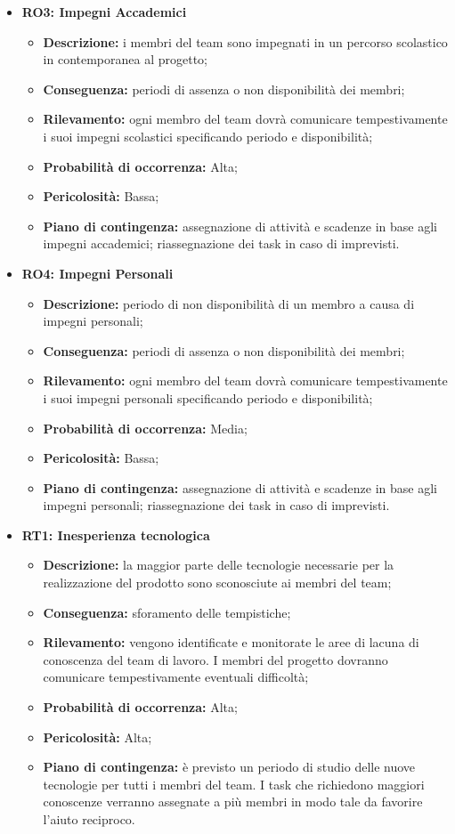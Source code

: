 \begin{itemize}
	\item \textbf{RO3: Impegni Accademici}
	\begin{itemize}
		\item \textbf{Descrizione:} i membri del team sono impegnati in un percorso scolastico in contemporanea al progetto;
		\item \textbf{Conseguenza:} periodi di assenza o non disponibilità dei membri;
		\item \textbf{Rilevamento:} ogni membro del team dovrà comunicare tempestivamente i suoi impegni scolastici specificando periodo e disponibilità;
		\item \textbf{Probabilità di occorrenza:} Alta;
		\item \textbf{Pericolosità:} Bassa;
		\item \textbf{Piano di contingenza:} assegnazione di attività e scadenze in base agli impegni accademici; riassegnazione dei task in caso di imprevisti.
	\end{itemize}
	
	\item \textbf{RO4: Impegni Personali}
	\begin{itemize}
		\item \textbf{Descrizione:} periodo di non disponibilità di un membro a causa di impegni personali;
		\item \textbf{Conseguenza:} periodi di assenza o non disponibilità dei membri;
		\item \textbf{Rilevamento:} ogni membro del team dovrà comunicare tempestivamente i suoi impegni personali specificando periodo e disponibilità;
		\item \textbf{Probabilità di occorrenza:} Media;
		\item \textbf{Pericolosità:} Bassa;
		\item \textbf{Piano di contingenza:} assegnazione di attività e scadenze in base agli impegni personali; riassegnazione dei task in caso di imprevisti.

	\end{itemize}
	
	\item \textbf{RT1: Inesperienza tecnologica}
	\begin{itemize}
		\item \textbf{Descrizione:} la maggior parte delle tecnologie necessarie per la realizzazione del prodotto sono sconosciute ai membri del team;
		\item \textbf{Conseguenza:} sforamento delle tempistiche;
		\item \textbf{Rilevamento:} vengono identificate e monitorate le aree di lacuna di conoscenza del team di lavoro. I membri del progetto dovranno comunicare tempestivamente eventuali difficoltà;
		\item \textbf{Probabilità di occorrenza:} Alta;
		\item \textbf{Pericolosità:} Alta;
		\item \textbf{Piano di contingenza:} è previsto un periodo di studio delle nuove tecnologie per tutti i membri del team. I task che richiedono maggiori conoscenze verranno assegnate a più membri in modo tale da favorire l'aiuto reciproco.
	\end{itemize}
	

\end{itemize}
